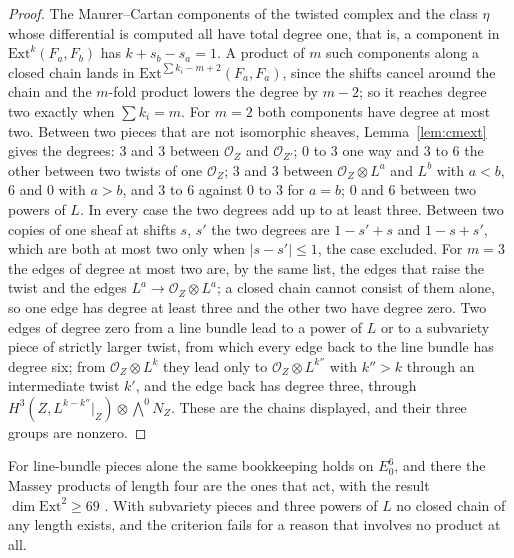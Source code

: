 \documentclass[11pt,reqno]{amsart}
\numberwithin{equation}{section}
\theoremstyle{plain}
\theoremstyle{definition}
\newcommand{\Ext}{\mathrm{Ext}}
\begin{document}
\begin{proof}
The Maurer--Cartan components of the twisted complex and the class $\eta$ whose differential is computed all have total degree one, that is, a component in $\Ext^{k}(F_{a},F_{b})$ has $k+s_{b}-s_{a}=1$. A product of $m$ such components along a closed chain lands in $\Ext^{\sum k_{i}-m+2}(F_{a},F_{a})$, since the shifts cancel around the chain and the $m$-fold product lowers the degree by $m-2$; so it reaches degree two exactly when $\sum k_{i}=m$. For $m=2$ both components have degree at most two. Between two pieces that are not isomorphic sheaves, Lemma~\ref{lem:cmext} gives the degrees: $3$ and $3$ between $\mathcal{O}_{Z}$ and $\mathcal{O}_{Z'}$; $0$ to $3$ one way and $3$ to $6$ the other between two twists of one $\mathcal{O}_{Z}$; $3$ and $3$ between $\mathcal{O}_{Z}\otimes L^{a}$ and $L^{b}$ with $a<b$, $6$ and $0$ with $a>b$, and $3$ to $6$ against $0$ to $3$ for $a=b$; $0$ and $6$ between two powers of $L$. In every case the two degrees add up to at least three. Between two copies of one sheaf at shifts $s$, $s'$ the two degrees are $1-s'+s$ and $1-s+s'$, which are both at most two only when $|s-s'|\le1$, the case excluded. For $m=3$ the edges of degree at most two are, by the same list, the edges that raise the twist and the edges $L^{a}\to\mathcal{O}_{Z}\otimes L^{a}$; a closed chain cannot consist of them alone, so one edge has degree at least three and the other two have degree zero. Two edges of degree zero from a line bundle lead to a power of $L$ or to a subvariety piece of strictly larger twist, from which every edge back to the line bundle has degree six; from $\mathcal{O}_{Z}\otimes L^{k}$ they lead only to $\mathcal{O}_{Z}\otimes L^{k''}$ with $k''>k$ through an intermediate twist $k'$, and the edge back has degree three, through $H^{3}(Z,L^{k-k''}|_{Z})\otimes\bigwedge^{0}N_{Z}$. These are the chains displayed, and their three groups are nonzero.

\end{proof}

For line-bundle pieces alone the same bookkeeping holds on $E_{0}^{6}$, and there the Massey products of length four are the ones that act, with the result $\dim\Ext^{2}\ge69$ \cite[Thm.~18.35]{BMB26}. With subvariety pieces and three powers of $L$ no closed chain of any length exists, and the criterion fails for a reason that involves no product at all.
\end{document}
